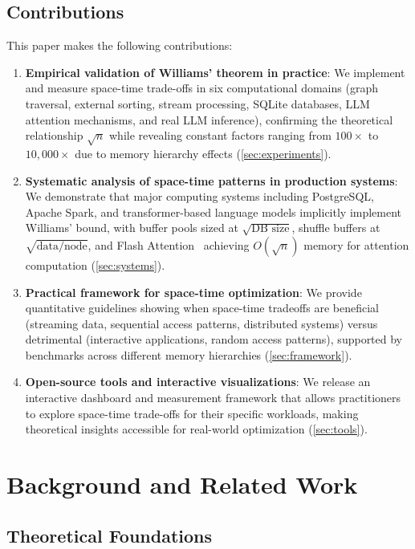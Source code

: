 \documentclass[11pt]{article}
\theoremstyle{definition}
\begin{document}
\subsection{Contributions}

This paper makes the following contributions:

\begin{enumerate}
\item \textbf{Empirical validation of Williams' theorem in practice}: We implement and measure space-time trade-offs in six computational domains (graph traversal, external sorting, stream processing, SQLite databases, LLM attention mechanisms, and real LLM inference), confirming the theoretical relationship $\sqrt{n}$ while revealing constant factors ranging from $100\times$ to $10{,}000\times$ due to memory hierarchy effects (\cref{sec:experiments}).

\item \textbf{Systematic analysis of space-time patterns in production systems}: We demonstrate that major computing systems including PostgreSQL, Apache Spark, and transformer-based language models implicitly implement Williams' bound, with buffer pools sized at $\sqrt{\text{DB size}}$, shuffle buffers at $\sqrt{\text{data/node}}$, and Flash Attention~\cite{flashattention2022} achieving $O(\sqrt{n})$ memory for attention computation (\cref{sec:systems}).

\item \textbf{Practical framework for space-time optimization}: We provide quantitative guidelines showing when space-time tradeoffs are beneficial (streaming data, sequential access patterns, distributed systems) versus detrimental (interactive applications, random access patterns), supported by benchmarks across different memory hierarchies (\cref{sec:framework}).

\item \textbf{Open-source tools and interactive visualizations}: We release an interactive dashboard and measurement framework that allows practitioners to explore space-time trade-offs for their specific workloads, making theoretical insights accessible for real-world optimization (\cref{sec:tools}).
\end{enumerate}

\section{Background and Related Work}

\subsection{Theoretical Foundations}
\end{document}
